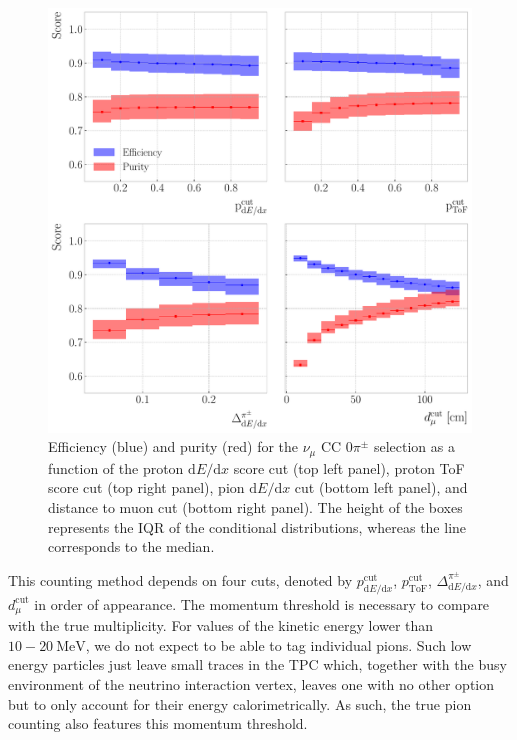 \begin{figure}[t]
    \centering
    \includegraphics[width=.85\linewidth]{Images/GAr_selection/pion_selection_0_pions_metrics.pdf}
    \caption[Efficiency and purity for the $\nu_{\mu}$ CC $0\pi^{\pm}$ selection as a function of the different cuts.]{Efficiency (blue) and purity (red) for the $\nu_{\mu}$ CC $0\pi^{\pm}$ selection as a function of the proton $\mathrm{d}E/\mathrm{d}x$ score cut (top left panel), proton ToF score cut (top right panel), pion $\mathrm{d}E/\mathrm{d}x$ cut (bottom left panel), and distance to muon cut (bottom right panel). The height of the boxes represents the IQR of the conditional distributions, whereas the line corresponds to the median.}
    \label{fig:pion_selection_0_pions_metrics}
\end{figure}

This counting method depends on four cuts, denoted by $p^{\mathrm{cut}}_{\mathrm{d}E/\mathrm{d}x}$, $p^{\mathrm{cut}}_{\mathrm{ToF}}$, $\Delta^{\pi^{\pm}}_{\mathrm{d}E/\mathrm{d}x}$, and $d^{\mathrm{cut}}_{\mu}$ in order of appearance. The momentum threshold is necessary to compare with the true multiplicity. For values of the kinetic energy lower than $10-20~\mathrm{MeV}$, we do not expect to be able to tag individual pions. Such low energy particles just leave small traces in the TPC which, together with the busy environment of the neutrino interaction vertex, leaves one with no other option but to only account for their energy calorimetrically. As such, the true pion counting also features this momentum threshold.


